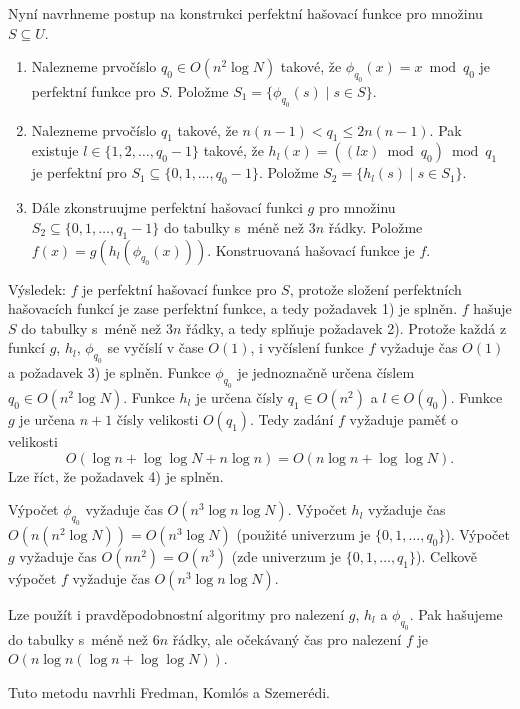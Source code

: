 \documentclass[a4paper,12pt]{article}
\begin{document}
Nyní navrhneme postup na konstrukci perfektní 
hašovací funk\-ce pro množinu $S\subseteq U$.

\begin{enumerate}
\item
Nalezneme prvočíslo $q_0\in O(n^2\log N)$ takové, že 
$\phi_{q_0}(x)=x\bmod q_0$ je perfektní funkce pro $S$. Položme 
$S_1=\{\phi_{q_0}(s)\mid s\in S\}$.
\item
Nalezneme prvočíslo $q_1$ takové, že 
$n(n-1)<q_1\le 2n(n-1)$. Pak existuje 
$l\in \{1,2,\dots,q_0-1\}$ takové, že $h_l(x)=((lx)\bmod q_0
)\bmod q_1$ 
je perfektní pro $S_1\subseteq \{0,1,\dots,q_0-1\}$. Položme 
$S_2=\{h_l(s)\mid s\in S_1\}$.
\item
Dále zkonstruujme perfektní hašovací funkci 
$g$ pro množinu 
$S_2\subseteq \{0,1,\dots,q_1-1\}$ do tabulky s~méně než $
3n$ řádky. 
Položme $f(x)=g(h_l(\phi_{q_0}(x)))$. Konstruovaná hašovací 
funkce je $f$.
\end{enumerate}

Výsledek: $f$ je perfektní hašovací funkce pro $
S$, protože 
složení perfektních hašovacích funkcí je zase perfektní 
funkce, a tedy požadavek 1) je splněn. \newline 
$f$ hašuje $S$ do tabulky s~méně než $3n$ řádky, a tedy 
splňuje požadavek 2). \newline 
Protože každá z funkcí $g$, $h_l$, $\phi_{q_0}$ se vyčíslí v čase $
O(1)$, 
i vyčíslení funkce $f$ vyžaduje čas $O(1)$ a požadavek 3) je 
splněn.\newline 
Funkce $\phi_{q_0}$ je jednoznačně určena číslem $
q_0\in O(n^2\log N)$. 
Funkce $h_l$ je určena čísly $q_1\in O(n^2)$ a $l\in O(
q_0)$. Funkce $g$ 
je určena $n+1$ čísly velikosti $O(q_1)$. Tedy zadání $
f$ 
vyžaduje paměť o velikosti 
$$O(\log n+\log\log N+n\log n)=O(n\log n+\log\log N).$$
Lze říct, že požadavek 4) je splněn. 

Výpočet $\phi_{q_0}$ vyžaduje čas $O(n^3\log 
n\log N)$. Výpočet $h_l$ 
vyža\-du\-je čas $O(n(n^2\log N))=O(n^3\log N)$ (použité univerzum je 
$\{0,1,\dots,q_0\}$). Výpočet $g$ vyžaduje čas $O(nn^2
)=O(n^3)$ 
(zde univerzum je $\{0,1,\dots,q_1\}$). Celkově 
výpočet $f$ vyžaduje čas $O(n^3\log n\log N)$.

Lze použít i pravděpodobnostní algoritmy pro nalezení 
$g$, $h_l$ a $\phi_{q_0}$. Pak hašujeme do tabulky s~méně než $
6n$ 
řádky, ale očekávaný čas pro nalezení $f$ je 
$O(n\log n(\log n+\log\log N))$.


Tuto metodu navrhli Fredman, Komlós a Szemerédi.
\end{document}
